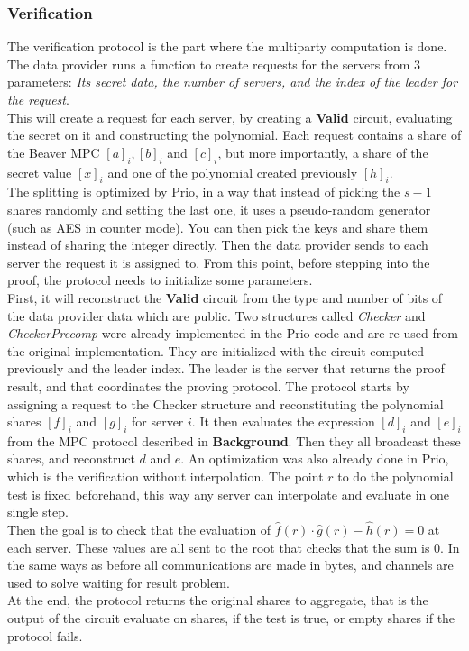 \documentclass{article}
\begin{document}
\subsubsection*{Verification}
The verification protocol is the part where the multiparty computation is done. The data provider runs a function to create requests for the servers from 3 parameters: \textit{Its secret data, the number of servers, and the index of the leader for the request}.\\
This will create a request for each server, by creating a \textbf{Valid} circuit, evaluating the secret on it and constructing the polynomial. Each request contains a share of the Beaver MPC $[a]_i, [b]_i $ and $ [c]_i$, but more importantly, a share of the secret value $[x]_i$ and one of the polynomial created previously $[h]_i$.\\

The splitting is optimized by Prio, in a way that instead of picking the $s-1$ shares randomly and setting the last one, it uses a pseudo-random generator (such as AES in counter mode). You can then pick the keys and share them instead of sharing the integer directly.
Then the data provider sends to each server the request it is assigned to. From this point, before stepping into the proof, the protocol needs to initialize some parameters.\\

First, it will reconstruct the \textbf{Valid} circuit from the type and number of bits of the data provider data which are public.  Two structures called \textit{Checker} and \textit{CheckerPrecomp} were already implemented in the Prio code and are re-used from the original implementation. They are initialized with the circuit computed previously and the leader index. The leader is the server that returns the proof result, and that coordinates the proving protocol.
The protocol starts by assigning a request to the Checker structure and reconstituting the polynomial shares $[f]_i $ and $[g]_i$ for server $i$. It then evaluates the expression $[d]_i $ and $[e]_i$ from the MPC protocol described in \textbf{Background}. Then they all broadcast these shares, and reconstruct $d$ and $e$.
An optimization was also already done in Prio, which is the verification without interpolation. The point $r$ to do the polynomial test is fixed beforehand, this way any server can interpolate and evaluate in one single step.\\
Then the goal is to check that the evaluation of $\hat{f}(r) \cdot \hat{g}(r) -\hat{h}(r) = 0$ at each server. These values are all sent to the root that checks that the sum is 0.
In the same ways as before all communications are made in bytes, and channels are used to solve waiting for result problem.\\
At the end, the protocol returns the original shares to aggregate, that is the output of the circuit evaluate on shares, if the test is true, or empty shares if the protocol fails.
\end{document}
